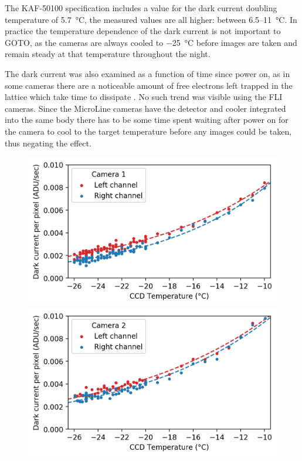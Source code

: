 \begin{colsection}
\begin{colsection}
The KAF-50100 specification includes a value for the dark current doubling temperature of \SI{5.7}{\celsius}, the measured values are all higher: between 6.5--\SI{11}{\celsius}. In practice the temperature dependence of the dark current is not important to GOTO, as the cameras are always cooled to \SI{-25}{\celsius} before images are taken and remain steady at that temperature throughout the night.

The dark current was also examined as a function of time since power on, as in some cameras there are a noticeable amount of free electrons left trapped in the lattice which take time to dissipate \citep{Liam}. No such trend was visible using the FLI cameras. Since the MicroLine cameras have the detector and cooler integrated into the same body there has to be some time spent waiting after power on for the camera to cool to the target temperature before any images could be taken, thus negating the effect.

\begin{figure}[p]
    \begin{center}
        \begin{minipage}[t]{0.49\textwidth}\vspace{10pt}
            \includegraphics[width=\linewidth]{images/detectors/dc_1.png}
        \end{minipage}
        \begin{minipage}[t]{0.49\textwidth}\vspace{10pt}
            \includegraphics[width=\linewidth]{images/detectors/dc_2.png}
        \end{minipage}


\end{center}
\end{figure}
\end{colsection}
\end{colsection}
